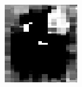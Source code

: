 \documentclass[a4paper, 12pt, titlepage, oneside, french]{article}
\begin{document}
\begin{figure}[]
\begin{subfigure}[b]{0.3\linewidth}
			\includegraphics[width=\linewidth]{DipoleExemple2.png}
		\end{subfigure}
		\begin{subfigure}[b]{0.3\linewidth}

\end{subfigure}
\end{figure}
\end{document}
